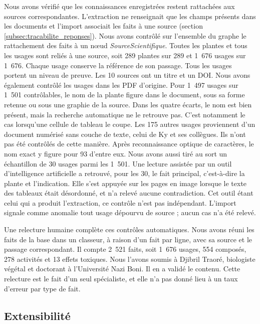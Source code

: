 Nous avons vérifié que les connaissances enregistrées restent rattachées aux sources correspondantes. L'extraction ne renseignait que les champs présents dans les documents et l'import associait les faits à une source (section \ref{subsec:tracabilite_reponses}). Nous avons contrôlé sur l'ensemble du graphe le rattachement des faits à un nœud \textit{SourceScientifique}. Toutes les plantes et tous les usages sont reliés à une source, soit 289 plantes sur 289 et 1~676 usages sur 1~676. Chaque usage conserve la référence de son passage. Tous les usages portent un niveau de preuve. Les 10 sources ont un titre et un DOI. Nous avons également contrôlé les usages dans les PDF d'origine. Pour 1~497 usages sur 1~501 contrôlables, le nom de la plante figure dans le document, sous sa forme retenue ou sous une graphie de la source. Dans les quatre écarts, le nom est bien présent, mais la recherche automatique ne le retrouve pas. C'est notamment le cas lorsqu'une cellule de tableau le coupe. Les 175 autres usages proviennent d'un document numérisé sans couche de texte, celui de Ky et ses collègues. Ils n'ont pas été contrôlés de cette manière. Après reconnaissance optique de caractères, le nom exact y figure pour 93 d'entre eux. Nous avons aussi tiré au sort un échantillon de 30 usages parmi les 1~501. Une lecture assistée par un outil d'intelligence artificielle a retrouvé, pour les 30, le fait principal, c'est-à-dire la plante et l'indication. Elle s'est appuyée sur les pages en image lorsque le texte des tableaux était désordonné, et n'a relevé aucune contradiction. Cet outil étant celui qui a produit l'extraction, ce contrôle n'est pas indépendant. L'import signale comme anomalie tout usage dépourvu de source ; aucun cas n'a été relevé.

Une relecture humaine complète ces contrôles automatiques. Nous avons réuni les faits de la base dans un classeur, à raison d'un fait par ligne, avec sa source et le passage correspondant. Il compte 2~521 faits, soit 1~676 usages, 554 composés, 278 activités et 13 effets toxiques. Nous l'avons soumis à Djibril Traoré, biologiste végétal et doctorant à l'Université Nazi Boni. Il en a validé le contenu. Cette relecture est le fait d'un seul spécialiste, et elle n'a pas donné lieu à un taux d'erreur par type de fait.

\subsection{Extensibilité}
\label{subsec:res_extensibilite}

